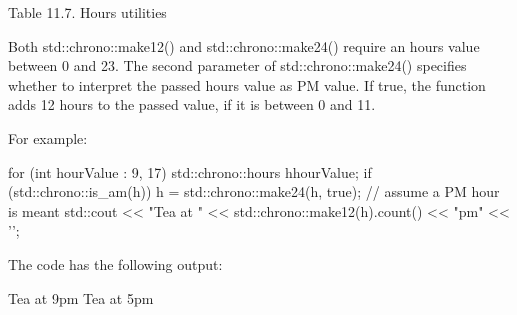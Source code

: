 \begin{center}
Table 11.7. Hours utilities
\end{center}

Both std::chrono::make12() and std::chrono::make24() require an hours value between 0 and 23. The second parameter of std::chrono::make24() specifies whether to interpret the passed hours value as PM value. If true, the function adds 12 hours to the passed value, if it is between 0 and 11.

For example:

\begin{cpp}
for (int hourValue : {9, 17}) {
	std::chrono::hours h{hourValue};
	if (std::chrono::is_am(h)) {
		h = std::chrono::make24(h, true); // assume a PM hour is meant
	}
	std::cout << "Tea at " << std::chrono::make12(h).count() << "pm" << '\n';
}
\end{cpp}

The code has the following output:

\begin{shell}
Tea at 9pm
Tea at 5pm
\end{shell}










